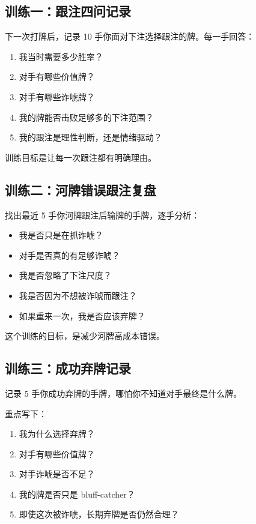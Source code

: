 \subsection*{训练一：跟注四问记录}

下一次打牌后，记录 10 手你面对下注选择跟注的牌。每一手回答：

\begin{enumerate}
\item 我当时需要多少胜率？
\item 对手有哪些价值牌？
\item 对手有哪些诈唬牌？
\item 我的牌能否击败足够多的下注范围？
\item 我的跟注是理性判断，还是情绪驱动？
\end{enumerate}

训练目标是让每一次跟注都有明确理由。

\subsection*{训练二：河牌错误跟注复盘}

找出最近 5 手你河牌跟注后输牌的手牌，逐手分析：

\begin{itemize}
\item 我是否只是在抓诈唬？
\item 对手是否真的有足够诈唬？
\item 我是否忽略了下注尺度？
\item 我是否因为不想被诈唬而跟注？
\item 如果重来一次，我是否应该弃牌？
\end{itemize}

这个训练的目标，是减少河牌高成本错误。

\subsection*{训练三：成功弃牌记录}

记录 5 手你成功弃牌的手牌，哪怕你不知道对手最终是什么牌。

重点写下：

\begin{enumerate}
\item 我为什么选择弃牌？
\item 对手有哪些价值牌？
\item 对手诈唬是否不足？
\item 我的牌是否只是 bluff-catcher？
\item 即使这次被诈唬，长期弃牌是否仍然合理？
\end{enumerate}

